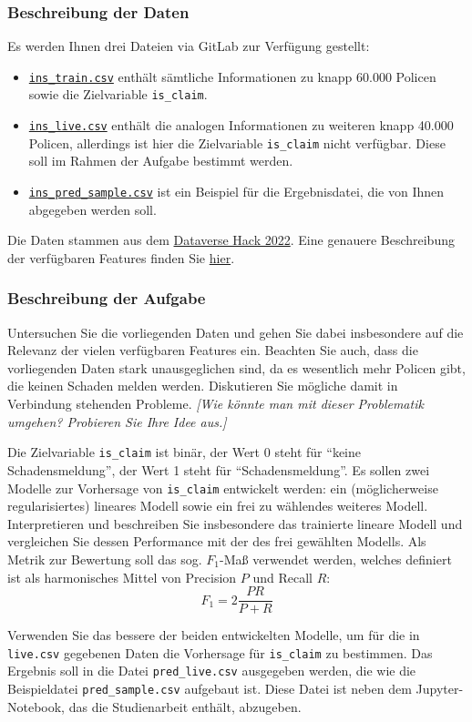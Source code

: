 \documentclass[11pt,a4paper]{article}
\begin{document}
\subsubsection*{Beschreibung der Daten}
Es werden Ihnen drei Dateien via GitLab zur Verfügung gestellt:
\begin{itemize}
	\item \href{https://gitlab.lrz.de/christian-moeller/machine-learning/-/raw/main/Studienarbeit/data/ins_train.csv}{\texttt{ins\_train.csv}} enthält sämtliche Informationen zu knapp 60.000 Policen sowie die Zielvariable \texttt{is\_claim}.
	\item \href{https://gitlab.lrz.de/christian-moeller/machine-learning/-/raw/main/Studienarbeit/data/ins_live.csv}{\texttt{ins\_live.csv}} enthält die analogen Informationen zu weiteren knapp 40.000 Policen, allerdings ist hier die Zielvariable \texttt{is\_claim} nicht verfügbar. Diese soll im Rahmen der Aufgabe bestimmt werden.
	\item \href{https://gitlab.lrz.de/christian-moeller/machine-learning/-/raw/main/Studienarbeit/data/ins_pred_sample}{\texttt{ins\_pred\_sample.csv}} ist ein Beispiel für die Ergebnisdatei, die von Ihnen abgegeben werden soll.
\end{itemize}
Die Daten stammen aus dem \href{https://datahack.analyticsvidhya.com/contest/dataverse/}{Dataverse Hack 2022}. Eine genauere Beschreibung der verfügbaren Features finden Sie \href{https://gitlab.lrz.de/christian-moeller/machine-learning/-/blob/main/Studienarbeit/data/ins_description.md}{hier}.

\subsubsection*{Beschreibung der Aufgabe}
Untersuchen Sie die vorliegenden Daten und gehen Sie dabei insbesondere auf die Relevanz der vielen verfügbaren Features ein. Beachten Sie auch, dass die vorliegenden Daten stark unausgeglichen sind, da es wesentlich mehr Policen gibt, die keinen Schaden melden werden. Diskutieren Sie mögliche damit in Verbindung stehenden Probleme. \emph{[Wie könnte man mit dieser Problematik umgehen? Probieren Sie Ihre Idee aus.]}

 Die Zielvariable \texttt{is\_claim} ist binär, der Wert 0 steht für ``keine Schadensmeldung'', der Wert 1 steht für ``Schadensmeldung''. Es sollen zwei Modelle zur Vorhersage von \texttt{is\_claim} entwickelt werden: ein (möglicherweise regularisiertes) lineares Modell sowie ein frei zu wählendes weiteres Modell. Interpretieren und beschreiben Sie insbesondere das trainierte lineare Modell und vergleichen Sie dessen Performance mit der des frei gewählten Modells. Als Metrik zur Bewertung soll das sog. $F_1$-Maß verwendet werden, welches definiert ist als harmonisches Mittel von Precision $P$ und Recall $R$:
 $$F_1 = 2\frac{PR}{P+R}$$

 Verwenden Sie das bessere der beiden entwickelten Modelle, um für die in \texttt{live.csv} gegebenen Daten die Vorhersage für \texttt{is\_claim} zu bestimmen. Das Ergebnis soll in die Datei \texttt{pred\_live.csv} ausgegeben werden, die wie die Beispieldatei \texttt{pred\_sample.csv} aufgebaut ist. Diese Datei ist neben dem Jupyter-Notebook, das die Studienarbeit enthält, abzugeben.
\end{document}
